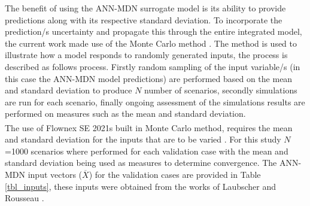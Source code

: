 \documentclass[a4paper,fleqn]{cas-dc}
\begin{document}
The benefit of using the ANN-MDN surrogate model is its ability to provide predictions along with  its respective standard deviation. To incorporate the prediction/s uncertainty and propagate this through the entire integrated model, the current work made use of the Monte Carlo method \cite{Thomopoulos2013}. The method is used to illustrate how a model responds to randomly generated inputs, the process is described as follows process. Firstly random sampling of the input variable/s (in this case the ANN-MDN model predictions) are performed based on the mean and standard deviation to produce $N$ number of scenarios, secondly simulations are run for each scenario, finally ongoing assessment of the simulations results are performed on measures such as the mean and standard deviation.\\ 

The use of Flownex SE\textsuperscript{\textregistered} 2021s built in Monte Carlo method, requires the mean and standard deviation for the inputs that are to be varied \cite{flownex}. For this study $N$=1000 scenarios where performed for each validation case with the mean and standard deviation being used as measures to determine convergence. The ANN-MDN input vectors ($\overline{X}$) for the validation cases are provided in Table \ref{tbl_inputs}, these inputs were obtained from the works of Laubscher and Rousseau \cite{Laubscher2019b}.\\
\end{document}
